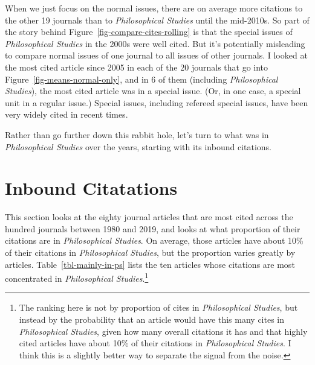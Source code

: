 \documentclass[
  10pt,
  letterpaper,
  DIV=11,
  numbers=noendperiod,
  twoside]{scrartcl}
\begin{document}
When we just focus on the normal issues, there are on average more
citations to the other 19 journals than to \emph{Philosophical Studies}
until the mid-2010s. So part of the story behind
Figure~\ref{fig-compare-cites-rolling} is that the special issues of
\emph{Philosophical Studies} in the 2000s were well cited. But it's
potentially misleading to compare normal issues of one journal to all
issues of other journals. I looked at the most cited article since 2005
in each of the 20 journals that go into
Figure~\ref{fig-means-normal-only}, and in 6 of them (including
\emph{Philosophical Studies}), the most cited article was in a special
issue. (Or, in one case, a special unit in a regular issue.) Special
issues, including refereed special issues, have been very widely cited
in recent times.

Rather than go further down this rabbit hole, let's turn to what was in
\emph{Philosophical Studies} over the years, starting with its inbound
citations.

\section{Inbound Citatations}\label{sec-inbound-citations}

This section looks at the eighty journal articles that are most cited
across the hundred journals between 1980 and 2019, and looks at what
proportion of their citations are in \emph{Philosophical Studies}. On
average, those articles have about 10\% of their citations in
\emph{Philosophical Studies}, but the proportion varies greatly by
articles. Table~\ref{tbl-mainly-in-ps} lists the ten articles whose
citations are most concentrated in \emph{Philosophical
Studies}.\footnote{The ranking here is not by proportion of cites in
  \emph{Philosophical Studies}, but instead by the probability that an
  article would have this many cites in \emph{Philosophical Studies},
  given how many overall citations it has and that highly cited articles
  have about 10\% of their citations in \emph{Philosophical Studies}. I
  think this is a slightly better way to separate the signal from the
  noise.}
\end{document}
